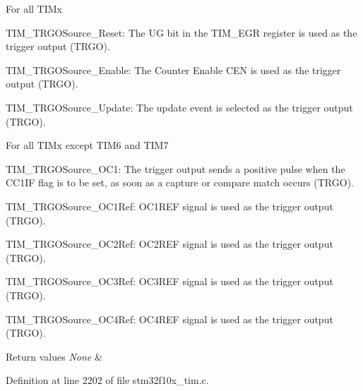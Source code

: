 \begin{DoxyItemize}
\item For all T\+I\+Mx \begin{DoxyItemize}
\item T\+I\+M\+\_\+\+T\+R\+G\+O\+Source\+\_\+\+Reset\+: The UG bit in the T\+I\+M\+\_\+\+E\+GR register is used as the trigger output (T\+R\+GO). \item T\+I\+M\+\_\+\+T\+R\+G\+O\+Source\+\_\+\+Enable\+: The Counter Enable C\+EN is used as the trigger output (T\+R\+GO). \item T\+I\+M\+\_\+\+T\+R\+G\+O\+Source\+\_\+\+Update\+: The update event is selected as the trigger output (T\+R\+GO).\end{DoxyItemize}

\item For all T\+I\+Mx except T\+I\+M6 and T\+I\+M7 \begin{DoxyItemize}
\item T\+I\+M\+\_\+\+T\+R\+G\+O\+Source\+\_\+\+O\+C1\+: The trigger output sends a positive pulse when the C\+C1\+IF flag is to be set, as soon as a capture or compare match occurs (T\+R\+GO). \item T\+I\+M\+\_\+\+T\+R\+G\+O\+Source\+\_\+\+O\+C1\+Ref\+: O\+C1\+R\+EF signal is used as the trigger output (T\+R\+GO). \item T\+I\+M\+\_\+\+T\+R\+G\+O\+Source\+\_\+\+O\+C2\+Ref\+: O\+C2\+R\+EF signal is used as the trigger output (T\+R\+GO). \item T\+I\+M\+\_\+\+T\+R\+G\+O\+Source\+\_\+\+O\+C3\+Ref\+: O\+C3\+R\+EF signal is used as the trigger output (T\+R\+GO). \item T\+I\+M\+\_\+\+T\+R\+G\+O\+Source\+\_\+\+O\+C4\+Ref\+: O\+C4\+R\+EF signal is used as the trigger output (T\+R\+GO).\end{DoxyItemize}

\begin{DoxyRetVals}{Return values}
{\em None} & \\
\hline
\end{DoxyRetVals}

\end{DoxyItemize}

Definition at line 2202 of file stm32f10x\+\_\+tim.\+c.

